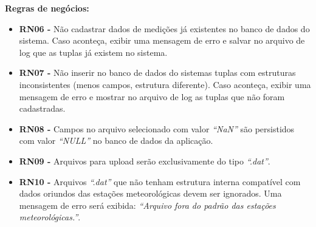 \begin{quadro}[H]
\begin{framed}
\begin{flushleft}
		\textbf{Regras de negócios:}
		\begin{itemize}
			\item[] \textbf{RN06 - } Não cadastrar dados de medições já existentes no banco de dados do sistema. Caso aconteça, exibir uma mensagem de erro e salvar no arquivo de log que as tuplas já existem no sistema.
			\item[] \textbf{RN07 - } Não inserir no banco de dados do sistemas tuplas com estruturas inconsistentes (menos campos, estrutura diferente). Caso aconteça, exibir uma mensagem de erro e mostrar no arquivo de log as tuplas que não foram cadastradas.
			\item[] \textbf{RN08 - } Campos no arquivo selecionado com valor \textit{``NaN''} são persistidos com valor \textit{``NULL''} no banco de dados da aplicação.
			\item[] \textbf{RN09 - } Arquivos para upload serão exclusivamente do tipo \textit{``.dat''}.
			\item[] \textbf{RN10 - } Arquivos \emph{``.dat''} que não tenham estrutura interna compatível com dados oriundos das estações meteorológicas devem ser ignorados. Uma mensagem de erro será exibida: \emph{``Arquivo fora do padrão das estações meteorológicas.''}.

		\end{itemize}

		\end{flushleft}

	\end{framed}

\end {quadro} %


